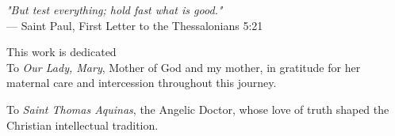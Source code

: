 \thispagestyle{empty}
{}

\vspace*{3cm}

\begin{center}
    \emph{"But test everything; hold fast what is good."} \\ \medskip
    --- Saint Paul, First Letter to the Thessalonians 5:21
\end{center}

\medskip

\begin{center}
    This work is dedicated \\ \medskip
    To \emph{Our Lady, Mary}, Mother of God and my mother, in gratitude for
    her maternal care and intercession throughout this journey. \\ \medskip
    
    To \emph{Saint Thomas Aquinas}, the Angelic Doctor, whose love of
    truth shaped the Christian intellectual tradition.
\end{center}

